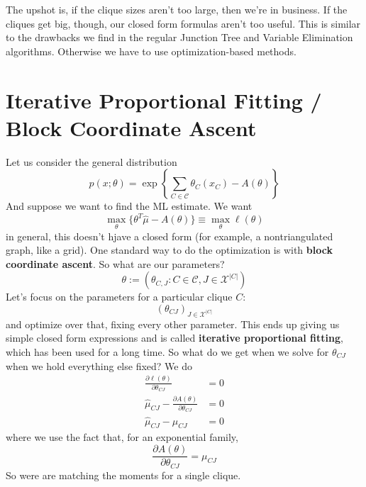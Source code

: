 \documentclass{article}
\begin{document}
The upshot is, if the clique sizes aren't too large, then we're in business.
If the cliques get big, though, our closed form formulas aren't too useful.
This is similar to the drawbacks we find in the regular Junction Tree and Variable Elimination algorithms.
Otherwise we have to use optimization-based methods.


\section{Iterative Proportional Fitting / Block Coordinate Ascent}

Let us consider the general distribution
$$
p(x;\theta)
=
\exp\left\{
\sum_{C\in\mathcal C} \theta_C (x_C)
- A(\theta)
\right\}
$$
And suppose we want to find the ML estimate.
We want
$$
\max_\theta
\{
\theta^T \hat\mu - A(\theta)
\}
\equiv
\max_\theta
\ell(\theta)
$$
in general, this doesn't hjave a closed form (for example, a nontriangulated graph, like a grid).
One standard way to do the optimization is with \textbf{block coordinate ascent}.
So what are our parameters?
$$
\theta := (
\theta_{C,J} : 
C\in\mathcal C,
J\in \mathcal X^{|C|}
)
$$
Let's focus on the parameters for a particular clique $C$:
$$
(\theta_{CJ})_{J\in\mathcal X^{|C|}}
$$
and optimize over that, fixing every other parameter.
This ends up giving us simple closed form expressions and is called \textbf{iterative proportional fitting}, which has been used for a long time.
So what do we get when we solve for $\theta_{CJ}$ when we hold everything else fixed?
We do
\begin{align}
\frac{\partial \ell(\theta)}{ \partial \theta_{CJ}} &= 0 
\\ 
\hat\mu_{CJ} - \frac{\partial A(\theta)}{\partial \theta_{CJ}}
&= 0
\\
\hat\mu_{CJ} - \mu_{CJ} &= 0
\end{align}
where we use the fact that, for an exponential family,
$$
\frac{\partial A(\theta)}{\partial \theta_{CJ}}
= \mu_{CJ}
$$
So were are matching the moments for a single clique.
\end{document}
